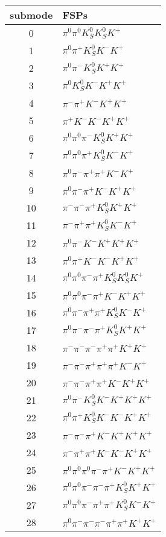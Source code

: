 \begin{table}[h!]
\begin{center}
\begin{tabular}{cl}
\hline
submode& FSPs\\
\hline
0 & $\pi^0 \pi^0 K_S^0 K_S^0 K^+ $ \\
1 & $\pi^0 \pi^+ K_S^0 K^- K^+ $ \\
2 & $\pi^0 \pi^- K_S^0 K^+ K^+ $ \\
3 & $\pi^0 K_S^0 K^- K^+ K^+ $ \\
4 & $\pi^- \pi^+ K^- K^+ K^+ $ \\
5 & $\pi^+ K^- K^- K^+ K^+ $ \\
6 & $\pi^0 \pi^0 \pi^- K_S^0 K^+ K^+ $ \\
7 & $\pi^0 \pi^0 \pi^+ K_S^0 K^- K^+ $ \\
8 & $\pi^0 \pi^- \pi^+ \pi^+ K^- K^+ $ \\
9 & $\pi^0 \pi^- \pi^+ K^- K^+ K^+ $ \\
10 & $\pi^- \pi^- \pi^+ K_S^0 K^+ K^+ $ \\
11 & $\pi^- \pi^+ \pi^+ K_S^0 K^- K^+ $ \\
12 & $\pi^0 \pi^- K^- K^+ K^+ K^+ $ \\
13 & $\pi^0 \pi^+ K^- K^- K^+ K^+ $ \\
14 & $\pi^0 \pi^0 \pi^- \pi^+ K_S^0 K_S^0 K^+ $ \\
15 & $\pi^0 \pi^0 \pi^- \pi^+ K^- K^+ K^+ $ \\
16 & $\pi^0 \pi^- \pi^+ \pi^+ K_S^0 K^- K^+ $ \\
17 & $\pi^0 \pi^- \pi^- \pi^+ K_S^0 K^+ K^+ $ \\
18 & $\pi^- \pi^- \pi^- \pi^+ \pi^+ K^+ K^+ $ \\
19 & $\pi^- \pi^- \pi^+ \pi^+ \pi^+ K^- K^+ $ \\
20 & $\pi^- \pi^- \pi^+ \pi^+ K^- K^+ K^+ $ \\
21 & $\pi^0 \pi^- K_S^0 K^- K^+ K^+ K^+ $ \\
22 & $\pi^0 \pi^+ K_S^0 K^- K^- K^+ K^+ $ \\
23 & $\pi^- \pi^- \pi^+ K^- K^+ K^+ K^+ $ \\
24 & $\pi^- \pi^+ \pi^+ K^- K^- K^+ K^+ $ \\
25 & $\pi^0 \pi^0 \pi^0 \pi^- \pi^+ K^- K^+ K^+ $ \\
26 & $\pi^0 \pi^0 \pi^- \pi^- \pi^+ K_S^0 K^+ K^+ $ \\
27 & $\pi^0 \pi^0 \pi^- \pi^+ \pi^+ K_S^0 K^- K^+ $ \\
28 & $\pi^0 \pi^- \pi^- \pi^- \pi^+ \pi^+ K^+ K^+ $ \\

\end{tabular}
\end{center}
\end{table}
